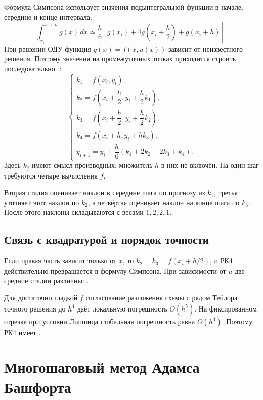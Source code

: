 \documentclass[../final.tex]{subfiles}
\begin{document}
Формула Симпсона использует значения подынтегральной функции в начале,
середине и конце интервала:
\begin{equation*}
    \int_{x_i}^{x_i+h}g(x)\,dx
    \simeq\frac h6\left[g(x_i)+4g\!\left(x_i+\frac h2\right)
    +g(x_i+h)\right].
\end{equation*}
При решении ОДУ функция $g(x)=f(x,u(x))$ зависит от неизвестного
решения. Поэтому значения на промежуточных точках приходится
строить последовательно. :
\begin{equation*}
    \begin{cases}
        k_1=f(x_i,y_i),\\[0.35em]
        k_2=f\!\left(x_i+\dfrac h2,y_i+\dfrac h2 k_1\right),\\[0.35em]
        k_3=f\!\left(x_i+\dfrac h2,y_i+\dfrac h2 k_2\right),\\[0.35em]
        k_4=f(x_i+h,y_i+h k_3),\\[0.35em]
        y_{i+1}=y_i+\dfrac h6(k_1+2k_2+2k_3+k_4).
    \end{cases}
\end{equation*}
Здесь $k_j$ имеют смысл производных; множитель $h$ в них не включён.
На один шаг требуются четыре вычисления $f$.

Вторая стадия оценивает наклон в середине шага по прогнозу из $k_1$,
третья уточняет этот наклон по $k_2$, а четвёртая оценивает наклон
на конце шага по $k_3$. После этого наклоны складываются с весами
$1,2,2,1$.

\subsection{Связь с квадратурой и порядок точности}

Если правая часть зависит только от $x$, то $k_2=k_3=f(x_i+h/2)$,
и РК4 действительно превращается в формулу Симпсона.
При зависимости от $u$ две средние стадии различны:
.

Для достаточно гладкой $f$ согласование разложения схемы с рядом Тейлора
точного решения до $h^4$ даёт локальную погрешность $O(h^5)$.
На фиксированном отрезке при условии Липшица глобальная погрешность
равна $O(h^4)$. Поэтому РК4 имеет .

\section{Многошаговый метод Адамса--Башфорта}
\end{document}
